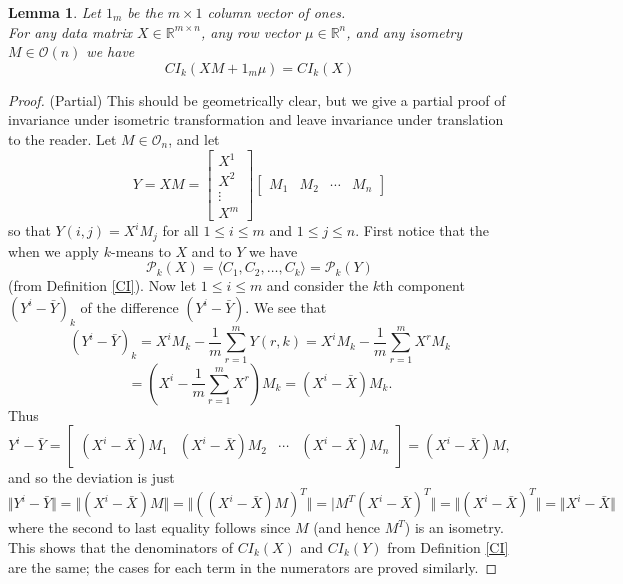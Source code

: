 \documentclass{article}
\newtheorem{lemma}[theorem]{Lemma}
\begin{document}
\begin{lemma}  Let $1_{m}$ be the $m \times 1$ column vector of ones.\\
For any data matrix $X\in \mathbb{R}^{m\times n}$, any row vector $\mu \in \mathbb{R}^{n}$, and any isometry $M\in \mathscr{O}(n)$ we have
$$CI_{k}(XM + 1_{m}\mu) = CI_{k}(X)$$
\end{lemma}
\begin{proof}(Partial)
This should be geometrically clear, but we give a partial proof of invariance under isometric transformation and leave invariance under translation to the reader.  Let $M\in \mathscr{O}_{n}$, and let 
$$Y = XM = \left[ \begin{array}{c} X^{1} \\ X^{2} \\ \vdots \\ X^{m} \end{array} \right] \left[ \begin{array}{cccc} M_{1} & M_{2} & \cdots & M_{n} \end{array} \right]$$
so that $Y(i, j) = X^{i}M_{j}$ for all $1\leq i \leq m$ and $1\leq j \leq n$.
First notice that the when we apply $k$-means to $X$ and to $Y$ we have
$$\mathscr{P}_{k}(X) = \langle C_1, C_2, \ldots, C_k \rangle= \mathscr{P}_{k}(Y)$$
(from Definition \ref{CI}). 
Now let $1\leq i \leq m$ and consider the $k$th component $(Y^{i} - \bar{Y})_{k}$ of the difference $(Y^{i} - \bar{Y})$. We see that
$$(Y^{i} - \bar{Y})_{k} = X^{i}M_{k} - \frac{1}{m}\sum_{r=1}^{m} Y(r, k) = X^{i}M_{k} - \frac{1}{m}\sum_{r=1}^{m} X^{r}M_{k} $$
$$= (X^{i} - \frac{1}{m}\sum_{r=1}^{m} X^{r})M_{k} = (X^{i} - \bar{X})M_{k}.$$
Thus
$$Y^{i} - \bar{Y} =  \left[ \begin{array}{cccc} (X^{i}- \bar{X}) M_{1} & (X^{i}- \bar{X}) M_{2} & \cdots & (X^{i}- \bar{X}) M_{n} \end{array} \right] = (X^{i}- \bar{X})M,$$
and so the deviation is just 
$$\Vert Y^{i} - \bar{Y} \Vert = \Vert (X^{i} - \bar{X}) M \Vert =  \Vert ((X^{i} - \bar{X}) M)^{T} \Vert  = \vert M^{T} (X^{i} - \bar{X})^T \Vert = \Vert (X^{i} - \bar{X})^T \Vert  = \Vert X^{i} - \bar{X}\Vert $$
where the second to last equality follows since $M$ (and hence $M^{T}$) is an isometry.  This shows that the denominators of $CI_{k}(X)$ and $CI_{k}(Y)$ from Definition \ref{CI} are the same; the cases for each term in the numerators are proved similarly.
\end{proof}
\end{document}
